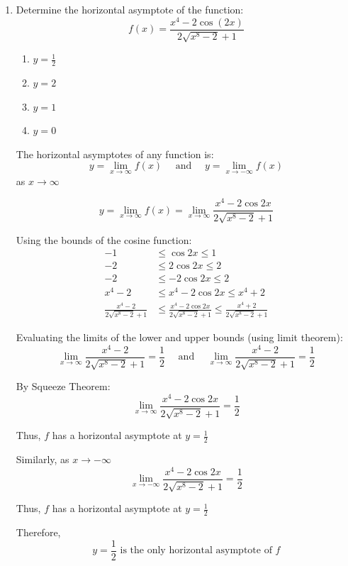 \begin{enumerate}
Therefore,
    \[
        \boxed{\lim_{x \to 5^-}{\frac{\left\lvert x - 5 \right\rvert}{2x^2 - 11x + 5}} = -\frac{1}{9}}
    \]

\item Determine the horizontal asymptote of the function: $$\displaystyle f(x) = \frac{x^4 - 2\cos{(2x)}}{2\sqrt{x^8 - 2} + 1}$$
\begin{enumerate}
    \item $y = \frac{1}{2}$
    \item $y = 2$
    \item $y = 1$
    \item $y = 0$
\end{enumerate}
The horizontal asymptotes of any function is:
    \[
        y = \lim_{x \to \infty} f(x) \quad \text{ and } \quad y = \lim_{x \to -\infty} f(x)
    \]
as $x \to \infty$

    \[
        y =\lim_{x \to \infty} f(x) = \lim_{x \to \infty}{\frac{x^4 - 2 \cos{2x}}{2 \sqrt{x^8 - 2} + 1}}
    \]

Using the bounds of the cosine function:
\begin{align*}
    -1 &\leq \cos{2x} \leq 1 \\
    -2 &\leq 2 \cos{2x} \leq 2 \\
    -2 &\leq -2 \cos{2x} \leq 2 \\
    x^4 - 2 &\leq x^4 - 2 \cos{2x} \leq x^4 + 2 \\
    \frac{x^4 - 2}{2 \sqrt{x^8 - 2} + 1} &\leq \frac{x^4 - 2 \cos {2x}}{2 \sqrt{x^8 - 2} + 1} \leq \frac{x^4 + 2}{2 \sqrt{x^8 - 2} + 1}
\end{align*}

Evaluating the limits of the lower and upper bounds (using limit theorem):
\[
    \lim_{x \to \infty}{\frac{x^4 - 2}{2 \sqrt{x^8 - 2} + 1}} = \frac{1}{2} \quad \text{ and } \quad \lim_{x \to \infty}\frac{x^4 - 2}{2 \sqrt{x^8 - 2} + 1} = \frac{1}{2}
\]

By Squeeze Theorem:
\[
    \lim_{x \to \infty}{\frac{x^4 - 2 \cos{2x}}{2 \sqrt{x^8 - 2} + 1}} = \frac{1}{2}
\]  

Thus, $f$ has a horizontal asymptote at $y = \frac{1}{2}$

Similarly, as $x \to -\infty$
\[
    \lim_{x \to -\infty}{\frac{x^4 - 2 \cos{2x}}{2 \sqrt{x^8 - 2} + 1}} = \frac{1}{2}
\]

Thus, $f$ has a horizontal asymptote at $y = \frac{1}{2}$

Therefore,
\[
    \boxed{y = \frac{1}{2} \text{ is the only horizontal asymptote of } f}
\]


\end{enumerate}
